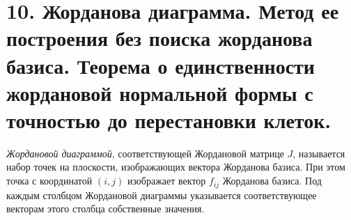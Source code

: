 \section{10. Жорданова диаграмма. Метод ее построения без поиска жорданова базиса. Теорема о единственности жордановой нормальной формы с точностью до перестановки клеток.}

\begin{definition}
    \textit{Жордановой диаграммой}, соответствующей Жордановой матрице $J$, называется набор точек на плоскости, изображающих вектора Жорданова базиса. При этом точка с координатой $(i, j)$ 
    изображает вектор $f_{ij}$ Жорданова базиса. Под каждым столбцом Жордановой диаграммы указывается соответствующее векторам этого 
    столбца собственные значения.
\end{definition}

